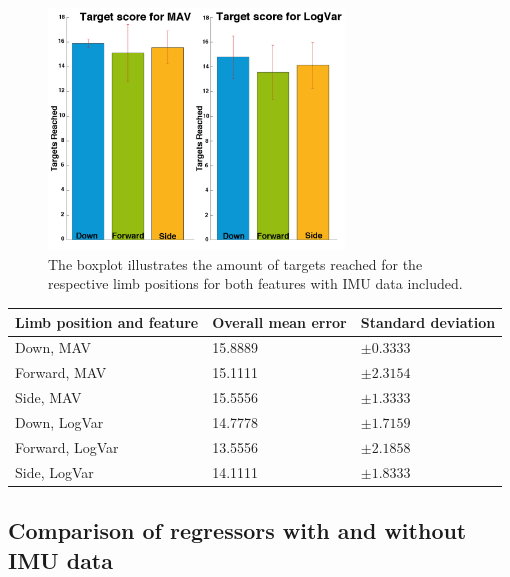 \begin{figure}[H]
	\includegraphics[width=0.7\textwidth]{figures/results/TargetsReachedIMU}  %
	\caption{The boxplot illustrates the amount of targets reached for the respective limb positions for both features with IMU data included.}
	\label{fig:TargetsReachedIMU}  %
\end{figure}

	\begin{center}
		\begin{tabular}{l l l}
			\toprule
			\textbf{Limb position and feature} & \textbf{Overall mean error} & \textbf{Standard deviation}\\
			\midrule
			Down, MAV & 15.8889 & $\pm 0.3333$ \\
			Forward, MAV & 15.1111 & $\pm 2.3154$ \\
			Side, MAV & 15.5556 & $\pm 1.3333$ \\
			Down, LogVar & 14.7778 & $\pm 1.7159$ \\
			Forward, LogVar & 13.5556 & $\pm 2.1858$ \\
			Side, LogVar & 14.1111 & $\pm 1.8333$ \\
			\bottomrule
		\end{tabular}
	\end{center}

\subsection{Comparison of regressors with and without IMU data}

